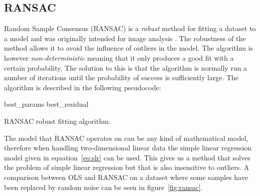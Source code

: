 \documentclass[a4paper]{report}
\begin{document}
\subsection{RANSAC}
Random Sample Consensus (RANSAC) is a \emph{robust} method for fitting a
dataset to a model and was originally intended for image analysis
\cite{fischler81}. The robustness of the method allows it to avoid the
influence of outliers in the model. The algorithm is however
\emph{non-deterministic} meaning that it only produces a good fit with a
certain probability. The solution to this is that the algorithm is normally
run a number of iterations until the probability of success is sufficiently
large. The algorithm is described in the following pseudocode:

\begin{algorithm}[h]
    \DontPrintSemicolon
    \BlankLine
    best\_params \gets \varnothing\;
    best\_residual \gets \infty\;
    \caption{RANSAC robust fitting algorithm.}
    \label{alg:ransac}
\end{algorithm}

The model that RANSAC operates on can be any kind of mathematical model, 
therefore when handling two-dimensional linear data the simple linear
regression model given in equation~\ref{eq:slr} can be used. This gives us a
method that solves the problem of simple linear regression but that is also
insensitive to outliers. A comparison between OLS and RANSAC on a dataset where
some samples have been replaced by random noise can be seen in
figure~\ref{fig:ransac}.
\end{document}
